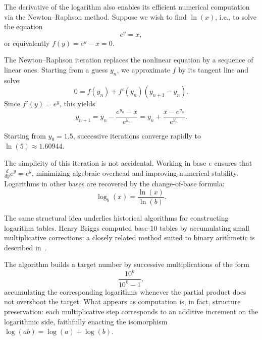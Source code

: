 \medskip

The derivative of the logarithm also enables its efficient numerical computation
via the Newton--Raphson method.
Suppose we wish to find $\ln(x)$, i.e., to solve the equation
\[
e^y = x,
\]
or equivalently $f(y) = e^y - x = 0$.

\medskip

The Newton--Raphson iteration replaces the nonlinear equation by a sequence of
linear ones.
Starting from a guess $y_n$, we approximate $f$ by its tangent line and solve:
\[
0 = f(y_n) + f'(y_n)(y_{n+1}-y_n).
\]
Since $f'(y) = e^y$, this yields
\[
y_{n+1} = y_n - \frac{e^{y_n}-x}{e^{y_n}}
         = y_n + \frac{x - e^{y_n}}{e^{y_n}}.
\]

Starting from $y_0 = 1.5$, successive iterations converge rapidly to
$\ln(5) \approx 1.60944$.

\medskip

The simplicity of this iteration is not accidental.
Working in base $e$ ensures that $\frac{d}{dy}e^y = e^y$,
minimizing algebraic overhead and improving numerical stability.
Logarithms in other bases are recovered by the change-of-base formula:
\[
\log_{b}(x) = \frac{\ln(x)}{\ln(b)}.
\]


\medskip

The same structural idea underlies historical algorithms for constructing
logarithm tables.
Henry Briggs computed base-10 tables by accumulating small multiplicative
corrections; a closely related method suited to binary arithmetic is described
in~\cite{knuth}.

\medskip

The algorithm builds a target number by successive multiplications of the form
\[
\frac{10^k}{10^k-1},
\]
accumulating the corresponding logarithms whenever the partial product does not
overshoot the target.
What appears as computation is, in fact, structure preservation:
each multiplicative step corresponds to an additive increment on the logarithmic
side, faithfully enacting the isomorphism $\log(ab) = \log(a) + \log(b)$.


